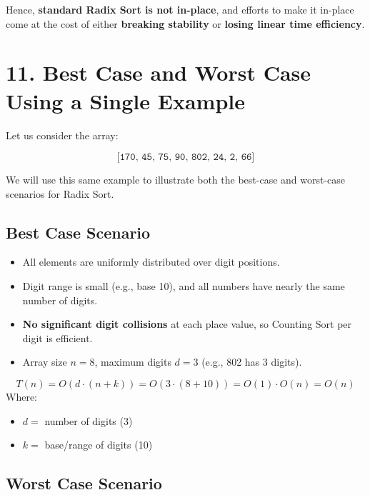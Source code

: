 \documentclass[14pt]{extarticle}
\begin{document}
Hence, \textbf{standard Radix Sort is not in-place}, and efforts to make it in-place come at the cost of either \textbf{breaking stability} or \textbf{losing linear time efficiency}.






\section*{11. Best Case and Worst Case Using a Single Example}

Let us consider the array:

\[
\texttt{[170, 45, 75, 90, 802, 24, 2, 66]}
\]

We will use this same example to illustrate both the best-case and worst-case scenarios for Radix Sort.

\subsection*{Best Case Scenario}

\begin{itemize}[leftmargin=1.5em]
    \item All elements are uniformly distributed over digit positions.
    \item Digit range is small (e.g., base 10), and all numbers have nearly the same number of digits.
    \item \textbf{No significant digit collisions} at each place value, so Counting Sort per digit is efficient.
    \item Array size $n = 8$, maximum digits $d = 3$ (e.g., 802 has 3 digits).
\end{itemize}

\begin{tcolorbox}[
  colback=white,
  colframe=black,
  title=Best Case Time Complexity
]
\[
T(n) = O(d \cdot (n + k)) = O(3 \cdot (8 + 10)) = O(1) \cdot O(n) = O(n)
\]
Where:
\begin{itemize}
  \item $d =$ number of digits (3)
  \item $k =$ base/range of digits (10)
\end{itemize}
\end{tcolorbox}

\subsection*{Worst Case Scenario}
\end{document}
